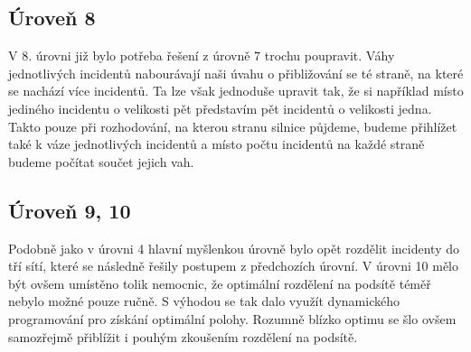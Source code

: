 \documentclass[12pt,a4paper]{article}
\begin{document}
\subsection*{Úroveň 8}
V 8. úrovni již bylo potřeba řešení z úrovně 7 trochu poupravit. Váhy jednotlivých incidentů nabourávají naši úvahu o přibližování se té straně, na které se nachází více incidentů.
Ta lze však jednoduše upravit tak, že si například místo jediného incidentu o velikosti pět představím pět incidentů o velikosti jedna. Takto pouze při rozhodování, na kterou stranu silnice půjdeme, budeme přihlížet také k váze jednotlivých incidentů a místo počtu incidentů na každé straně budeme počítat součet jejich vah.

\subsection*{Úroveň 9, 10}
Podobně jako v úrovni 4 hlavní myšlenkou úrovně bylo opět rozdělit incidenty do tří sítí, které se následně řešily postupem z předchozích úrovní. V úrovni 10 mělo být ovšem umístěno tolik nemocnic, že optimální rozdělení na podsítě téměř nebylo možné pouze ručně. S výhodou se tak dalo využít dynamického programování pro získání optimální polohy. Rozumně blízko optimu se šlo ovšem samozřejmě přiblížit i pouhým zkoušením rozdělení na podsítě.
\end{document}
